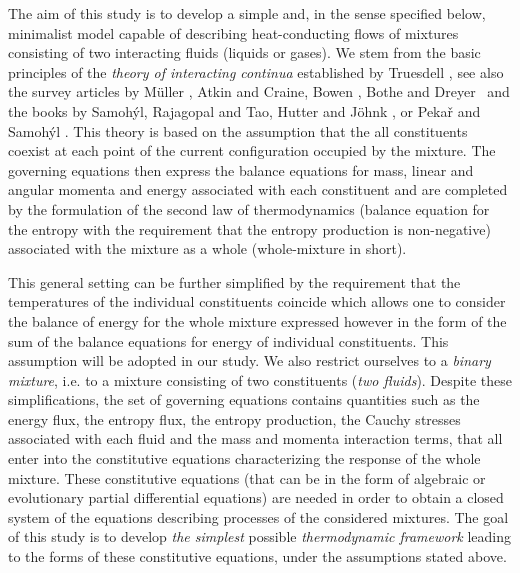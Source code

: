 \documentclass[a4paper]{article}
\begin{document}
The aim of this study is to develop a simple and, in the sense specified below, minimalist model capable of describing heat-conducting flows of mixtures consisting of two interacting fluids (liquids or gases).  We stem from the basic principles of the {\it theory of interacting continua} established by Truesdell \cite{Truesdell-1962}, 
see also the survey articles by 
M\"{u}ller \cite{Muller-1968}, Atkin and Craine\citep{Atkin-Craine-1976}, Bowen \cite{bowen.rm:continuum}, Bothe and Dreyer~\cite{bothe-2015} and the books by Samoh\'{y}l\cite{Samohyl-1987}, Rajagopal and Tao\cite{Rajagopal-and-Tao-1995}, Hutter and J\"{o}hnk \cite{hutter.k.johnk.k:continuum}, or Peka\v{r} and Samoh\'{y}l \cite{Pekar-2014}. This theory is based on the assumption that the all constituents coexist at each point of the current configuration occupied by the mixture. The governing equations then express the balance equations for mass, linear and angular momenta and energy associated with each constituent and are completed by the formulation of the second law of thermodynamics (balance equation for the entropy with the requirement that the entropy production is non-negative) associated with the mixture as a whole (whole-mixture in short). 

This general setting can be further simplified by the requirement that the temperatures of the individual constituents coincide which allows one to consider the balance of energy for the whole mixture expressed however in the form of the sum of the balance equations for energy of individual constituents. This assumption will be adopted in our study. %
We also restrict ourselves to a \textit{binary mixture}, i.e. to a mixture consisting of two constituents (\textit{two fluids}). Despite these simplifications, the set of governing equations contains quantities such as the energy flux, the entropy flux, the entropy production, the Cauchy stresses associated with each fluid and the mass and momenta interaction terms, that all enter into the constitutive equations characterizing the response of the whole mixture. These constitutive equations (that can be in the form of algebraic or evolutionary partial differential equations) are needed in order to obtain a closed system of the equations describing processes of the considered mixtures. The goal of this study is to develop \textit{the simplest} possible \textit{thermodynamic framework} leading to the forms of these constitutive equations, under the assumptions stated above. 
\end{document}
